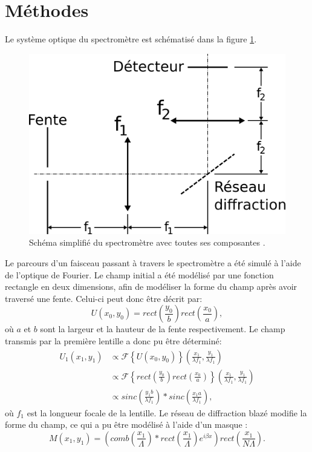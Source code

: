 \documentclass[conference]{IEEEtran}
\begin{document}
\section{Méthodes \label{methodes}}
Le système optique du spectromètre est schématisé dans la figure \ref{4f}.
\begin{figure}[H]
    \centering
    \includegraphics[scale=0.4]{4f.png}
    \caption{Schéma simplifié du spectromètre avec toutes ses composantes \cite{procedurier}. \label{4f}}
\end{figure}
Le parcours d'un faisceau passant à travers le spectromètre a été simulé à l'aide 
de l'optique de Fourier. Le champ initial a été modélisé par une fonction rectangle en deux dimensions,
afin de modéliser la forme du champ après avoir traversé une fente. Celui-ci peut donc être décrit par:
\[U(x_0,y_0)=rect(\frac{y_0}{b})rect(\frac{x_0}{a}),\]
où $a$ et $b$ sont la largeur et la hauteur de la fente respectivement. Le champ transmis par 
la première lentille a donc pu être déterminé:
\begin{align*}
    U_1(x_1,y_1)&\propto\mathscr{F}\left\{U(x_0,y_0)\right\}(\frac{x_1}{\lambda f_1},\frac{y_1}{\lambda f_1})\\
    &\propto \mathscr{F}\left\{rect(\frac{y_0}{b})rect(\frac{x_0}{a})\right\}(\frac{x_1}{\lambda f_1},\frac{y_1}{\lambda f_1})\\
    &\propto sinc(\frac{y_1b}{\lambda f_1})\ast sinc(\frac{x_1a}{\lambda f_1}),
\end{align*}
où $f_1$ est la longueur focale de la lentille. Le réseau de diffraction blazé modifie la forme du champ, ce qui a pu être
modélisé à l'aide d'un masque \cite{procedurier}:
\[M(x_1,y_1)=(comb(\frac{x_1}{\Lambda})\ast rect(\frac{x_1}{\Lambda})e^{i\beta x})rect(\frac{x_1}{N\Lambda}).\]
\end{document}

